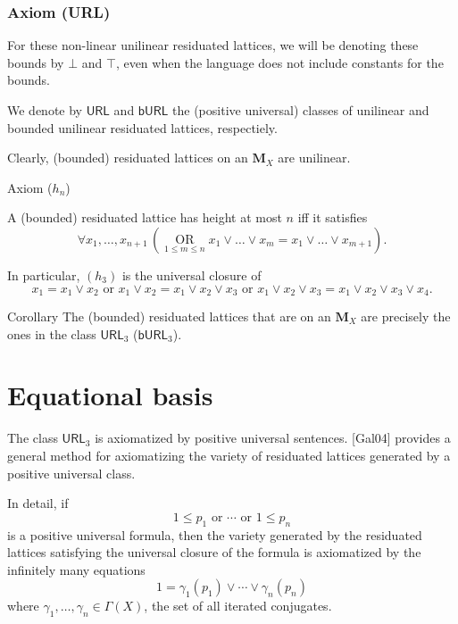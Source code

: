 \documentclass[professionalfont, handout, 10pt]{beamer} %
\theoremstyle{plain}
\theoremstyle{definition}
\DeclareMathOperator*{\bigor}{OR}
\begin{document}
\begin{frame}
\frametitle{Axiom (URL)}
    For these non-linear unilinear residuated lattices, we will be denoting these bounds by $\bot$ and $\top$, even when the language does not include constants for the bounds.\pause
    
    We denote by $\mathsf{URL}$ and $\mathsf{bURL}$ the (positive universal) classes of unilinear and bounded unilinear residuated lattices, respectiely.\pause
    
    Clearly, (bounded) residuated lattices on an $\mathbf{M}_X$ are unilinear.
\end{frame}

\begin{frame}{Axiom ($h_n$)}

    A (bounded) residuated lattice has height at most $n$ iff it satisfies
    \begin{equation}\tag{$h_n$}\label{axiom_of_finite_height}
            \forall x_1, \dots, x_{n+1} \, (\bigor \limits_{1 \leq m \leq n}
            x_1 \vee \dots \vee x_{m} = x_1 \vee \dots \vee x_{m+1}).
    \end{equation}

    In particular, $(h_3)$ is the universal closure of 
    $$x_1 = x_1 \vee x_2 \text{ or } x_1 \vee x_2 = x_1 \vee x_2 \vee x_3 \text{ or } x_1 \vee x_2 \vee x_3 = x_1 \vee x_2 \vee x_3 \vee x_4.$$

    \pause

    \begin{block}{Corollary}
        The (bounded) residuated lattices that are on an $\mathbf{M}_X$ are precisely the ones in the class $\mathsf{URL}_3$ ($\mathsf{bURL}_3$).
    \end{block}
\end{frame}

\section{Equational basis}

\begin{frame}
    The class $\mathsf{URL}_3$ is axiomatized by positive universal sentences.\pause
    {[Gal04]} provides a general method for axiomatizing the variety of residuated lattices generated by a positive universal class.\pause
    
    In detail, if $$1 \leq p_1 \text{ or } \cdots \text{ or } 1 \leq p_n$$ is a positive universal formula, \pause then the variety generated by the residuated lattices satisfying the universal closure of the formula is axiomatized by the infinitely many equations
    $$1 = \gamma_1(p_1) \vee \cdots \vee \gamma_n (p_n)$$
    where $ \gamma_1, \ldots,\gamma_n \in \Gamma(X)$, the set of all iterated conjugates.    
\end{frame}
\end{document}
